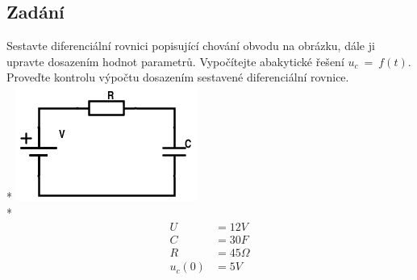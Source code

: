 \documentclass[a4paper, 10pt, fleqn]{article}
\begin{document}
\subsection*{Zadání}
Sestavte diferenciální rovnici popisující chování obvodu na obrázku, dále
ji upravte dosazením hodnot parametrů. Vypočítejte abakytické řešení $u_{c}~=~f(t)$.
Proveďte kontrolu výpočtu dosazením sestavené diferenciální rovnice.\\*
\includegraphics[scale=0.8]{IEL_OBR/5.png}\\*
\begin{align*}
 U &= 12 V \\
 C &= 30 F \\
 R &= 45 \Omega \\
 u_{c}(0) &= 5V \\
\end{align*}
\newpage
\end{document}
